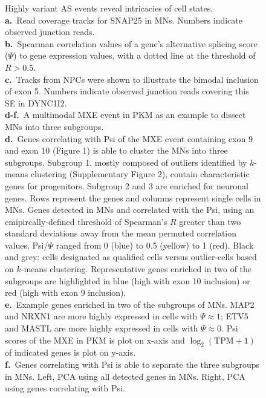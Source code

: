 \clearpage
\thispagestyle{facingcaption}
\begin{figure}[h]
\captionsetup{labelformat=prev-page}
\caption[Highly variant AS events reveal intricacies of cell states.]{
Highly variant AS events reveal intricacies of cell states.\\
\textbf{a.}~Read coverage tracks for SNAP25 in MNs. Numbers indicate observed junction reads.\\
\textbf{b.}~Spearman correlation values of a gene's alternative splicing score ($\Psi$) to gene expression values, with a dotted line at the threshold of $R > 0.5$.\\
\textbf{c.}~Tracks from NPCs were shown to illustrate the bimodal inclusion of exon 5. Numbers indicate observed junction reads covering this SE in DYNC1I2.\\
\textbf{d-f.}~A multimodal MXE event in PKM as an example to dissect MNs into three subgroups.\\
\textbf{d.}~Genes correlating with Psi of the MXE event containing exon 9 and exon 10 (Figure 1) is able to cluster the MNs into three subgroups. Subgroup 1, mostly composed of outliers identified by $k$-means clustering (Supplementary Figure 2), contain characteristic genes for progenitors. Subgroup 2 and 3 are enriched for neuronal genes. Rows represent the genes and columns represent single cells in MNs. Genes detected in MNs and correlated with the Psi, using an emipircally-defined threshold of Spearman's $R$ greater than two standard deviations away from the mean permuted correlation values. Psi/$\Psi$ ranged from 0 (blue) to 0.5 (yellow) to 1 (red). Black and grey: cells designated as qualified cells versus outlier-cells based on $k$-means clustering. Representative genes enriched in two of the subgroups are highlighted in blue (high with exon 10 inclusion) or red (high with exon 9 inclusion). \\
\textbf{e.}~Example genes enriched in two of the subgroups of MNs. MAP2 and NRXN1 are more highly expressed in cells with $\Psi \approx 1$; ETV5 and MASTL are more highly expressed in cells with $\Psi \approx 0$. Psi scores of the MXE in PKM is plot on x-axis and $\log_2(\mathrm{TPM}+1)$ of indicated genes is plot on y-axis.\\
\textbf{f.}~Genes correlating with Psi is able to separate the three subgroups in MNs. Left, PCA using all detected genes in MNs. Right, PCA using genes correlating with Psi.\\
}
\end{figure}
